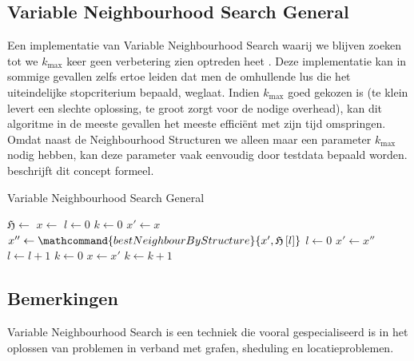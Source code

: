 \subsection{Variable Neighbourhood Search General}
Een implementatie van Variable Neighbourhood Search waarij we blijven zoeken tot we $k_{\mbox{max}}$ keer geen verbetering zien optreden heet . Deze implementatie kan in sommige gevallen zelfs ertoe leiden dat men de omhullende lus die het uiteindelijke stopcriterium bepaald, weglaat. Indien $k_{\mbox{max}}$ goed gekozen is (te klein levert een slechte oplossing, te groot zorgt voor de nodige overhead), kan dit algoritme in de meeste gevallen het meeste effici\"ent met zijn tijd omspringen. Omdat naast de Neighbourhood Structuren we alleen maar een parameter $k_{\mbox{max}}$ nodig hebben, kan deze parameter vaak eenvoudig door testdata bepaald worden.  beschrijft dit concept formeel.
\begin{algorithm}[htb]                      %
\caption{Variable Neighbourhood Search General}          %
\label{alg:variableNeighbourhoodSearchGeneral}                           %
\begin{algorithmic}[1]                    %
\STATE $\mathfrak{H}\leftarrow$
\STATE $x\leftarrow$
\STATE $l\leftarrow 0$
\STATE $k\leftarrow 0$
\STATE $x'\leftarrow x$
\STATE $x''\leftarrow\mathcommand{bestNeighbourByStructure}{x',\mathfrak{H}\left[l\right]}$
\STATE $l\leftarrow 0$
\STATE $x'\leftarrow x''$
\ELSE
\STATE $l\leftarrow l+1$
\ENDIF
\ENDWHILE
{}
\STATE $k\leftarrow 0$
\STATE $x\leftarrow x'$
\ELSE
\STATE $k\leftarrow k+1$
\ENDIF
\ENDWHILE
\end{algorithmic}
\end{algorithm}
\subsection{Bemerkingen}
Variable Neighbourhood Search is een techniek die vooral gespecialiseerd is in het oplossen van problemen in verband met grafen, sheduling en locatieproblemen.
